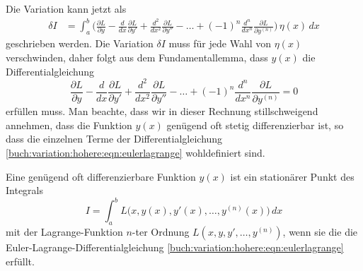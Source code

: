 Die Variation kann jetzt als
\begin{align*}
\delta I
&=
\int_a^b
\biggl(
\frac{\partial L}{\partial y}
-
\frac{d}{dx}
\frac{\partial L}{\partial y'}
+
\frac{d^2}{dx^2}
\frac{\partial L}{\partial y''}
-
\dots
+
(-1)^n
\frac{d^n}{dx^n}
\frac{\partial L}{\partial y^{(n)}}
\biggr)
\,
\eta(x)
\,dx
\end{align*}
geschrieben werden.
Die Variation $\delta I$ muss für jede Wahl von $\eta(x)$ verschwinden,
daher folgt aus dem Fundamentallemma, dass $y(x)$ die Differentialgleichung
\begin{equation}
\frac{\partial L}{\partial y}
-
\frac{d}{dx}
\frac{\partial L}{\partial y'}
+
\frac{d^2}{dx^2}
\frac{\partial L}{\partial y''}
-
\dots
+
(-1)^n
\frac{d^n}{dx^n}
\frac{\partial L}{\partial y^{(n)}}
=
0
\label{buch:variation:hohere:eqn:eulerlagrange}
\end{equation}
erfüllen muss.
Man beachte, dass wir in dieser Rechnung stillschweigend annehmen,
dass die Funktion $y(x)$ genügend oft stetig differenzierbar ist,
so dass die einzelnen Terme der Differentialgleichung
\eqref{buch:variation:hohere:eqn:eulerlagrange} wohldefiniert sind.

\begin{satz}
Eine genügend oft differenzierbare Funktion $y(x)$ ist ein stationärer
Punkt des Integrals
\[
I
=
\int_a^b
L\bigl(x,y(x),y'(x),\dots,y^{(n)}(x)\bigr)
\,dx
\]
mit der Lagrange-Funktion $n$-ter Ordnung $L(x,y,y',\dots,y^{(n)})$,
wenn sie die die Euler-Lagrange-Differentialgleichung
\eqref{buch:variation:hohere:eqn:eulerlagrange} erfüllt.
\end{satz}


